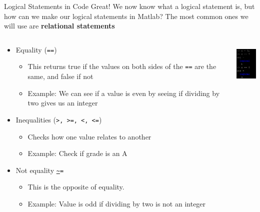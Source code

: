 {}\documentclass[letterpaper,
compress,
xcolor=x11names,
]{beamer}
\begin{document}

\begin{frame}{Logical Statements in Code}
	\footnotesize
	Great! We now know what a logical statement is, but how can we make our logical statements in Matlab? The most common ones we will use are \textbf{relational statements}
	\begin{columns}
		\begin{column}{0.7\linewidth}
			\begin{itemize}
				\item Equality (\texttt{==})
				\begin{itemize}
					\item This returns true if the values on both sides of the \texttt{==} are the same, and false if not
					\item Example: We can see if a value is even by seeing if dividing by two gives us an integer\\
				\end{itemize}
				\item Inequalities (\texttt{\textgreater, \textgreater=, \textless, \textless=})
				\begin{itemize}
					\item Checks how one value relates to another
					\item Example: Check if grade is an A \\
				\end{itemize}
				\item Not equality \texttt{\url{~}=} 
				\begin{itemize}
					\item This is the opposite of equality.
					\item Example: Value is odd if dividing by two is not an integer \\
				\end{itemize}
			\end{itemize}
		\end{column}
		\begin{column}{0.25\linewidth}
			\begin{center}
				\includegraphics[height = 2cm]{equality_example.png} \\

\end{center}
\end{column}
\end{columns}
\end{frame}
\end{document}
